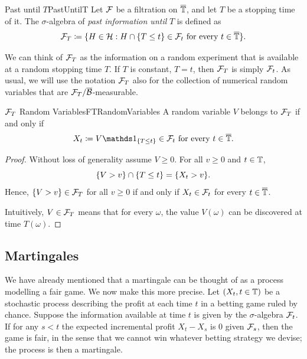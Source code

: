 \begin{defn}{Past until \(T\)}{PastUntilT}
	Let \(\mathcal{F}\) be a filtration on \(\overline{\mathbb{T}}\), and let \(T\) be a stopping time of it. The \(\sigma\)-algebra of \emph{past information until} \(T\) is defined as
	\begin{equation*}
		\mathcal{F}_T \coloneqq \{H \in \mathcal{H} : H \cap \{T \le t\} \in \mathcal{F}_t \text{ for every } t \in \overline{\mathbb{T}}\}.
	\end{equation*}
\end{defn}

We can think of \(\mathcal{F}_T\) as the information on a random experiment that is available at a random stopping time \(T\). If \(T\) is constant, \(T = t\), then \(\mathcal{F}_T\) is simply \(\mathcal{F}_t\). As usual, we will use the notation \(\mathcal{F}_T\) also for the collection of numerical random variables that are \(\mathcal{F}_T/\overline{\mathcal{B}}\)-measurable.

\begin{thm}{\(\mathcal{F}_T\) Random Variables}{FTRandomVariables}
	A random variable \(V\) belongs to \(\mathcal{F}_T\) if and only if
	\begin{equation*}
		X_t \coloneqq V \I_{\{T \le t\}} \in \cF_t \text{ for every } t \in \overline{\bb{T}}.
	\end{equation*}
\end{thm}

\begin{proof}
	Without loss of generality assume \(V \ge 0\). For all \(v \ge 0\) and \(t \in \mathbb{T}\),
	\[
		\{V > v\} \cap \{T \le t\} = \{X_t > v\}.
	\]
	Hence, \(\{V > v\} \in \mathcal{F}_T\) for all \(v \ge 0\) if and only if \(X_t \in \mathcal{F}_t\) for every \(t \in \overline{\mathbb{T}}\).

	Intuitively, \(V \in \mathcal{F}_T\) means that for every \(\omega\), the value \(V(\omega)\) can be discovered at time \(T(\omega)\).
\end{proof}
\subsection{Martingales}
We have already mentioned that a martingale can be thought of as a process modelling a fair game. We now make this more precise. Let \((X_t, t \in \mathbb{T})\) be a stochastic process describing the profit at each time \(t\) in a betting game ruled by chance. Suppose the information available at time \(t\) is given by the \(\sigma\)-algebra \(\mathcal{F}_t\). If for any \(s < t\) the expected incremental profit \(X_t - X_s\) is \(0\) given \(\mathcal{F}_s\), then the game is fair, in the sense that we cannot win whatever betting strategy we devise; the process is then a martingale.

